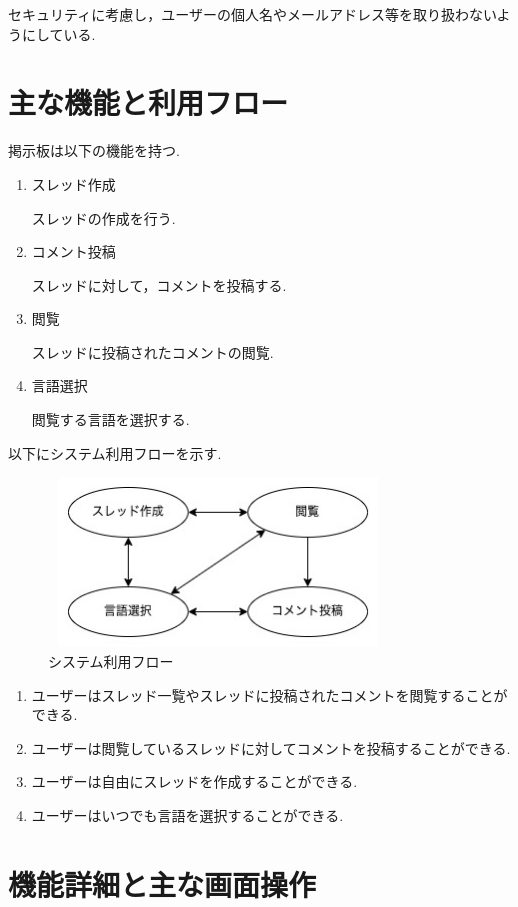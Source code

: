 \documentclass[b5paper,12pt]{jsreport}
\begin{document}
セキュリティに考慮し，ユーザーの個人名やメールアドレス等を取り扱わないようにしている.

\section{主な機能と利用フロー}

掲示板は以下の機能を持つ.
\begin{enumerate}
	\item スレッド作成
	
	スレッドの作成を行う.
	\item コメント投稿
	
	スレッドに対して，コメントを投稿する.
	\item 閲覧
	
	スレッドに投稿されたコメントの閲覧.
	\item 言語選択
	
	閲覧する言語を選択する.
\end{enumerate}

以下にシステム利用フローを示す.

\begin{figure}[htbp]
	\centering
	\includegraphics[width=90mm,height=45mm]{img/system.jpg}

	\caption{システム利用フロー}
\end{figure}

\begin{enumerate}
	\item ユーザーはスレッド一覧やスレッドに投稿されたコメントを閲覧することができる.
	\item ユーザーは閲覧しているスレッドに対してコメントを投稿することができる.
	\item ユーザーは自由にスレッドを作成することができる.
	\item ユーザーはいつでも言語を選択することができる.
\end{enumerate}


\section{機能詳細と主な画面操作}
\end{document}
